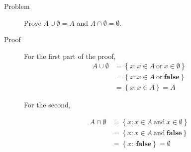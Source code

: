 \begin{description}
\item[Problem]
Prove $A \cup \emptyset = A$ and $A \cap \emptyset = \emptyset$.

\item[Proof]

For the first part of the proof,
\begin{equation*}
\begin{aligned}
A \cup \emptyset &= \left\{ x : x \in A\ \text{or}\ x \in \emptyset \right\}\\
                 &= \left\{ x : x \in A\ \text{or}\ \mathbf{false}\right\}\\
                 &= \left\{ x : x \in A\right\} = A
\end{aligned}
\end{equation*}

For the second,

\begin{equation*}
\begin{aligned}
A \cap \emptyset &= \left\{ x : x \in A\ \text{and}\ x \in \emptyset \right\}\\
                 &= \left\{ x : x \in A\ \text{and}\ \mathbf{false}\right\}\\
                 &= \left\{ x :\ \mathbf{false}\right\} = \emptyset
\end{aligned}
\end{equation*}

\end{description}
